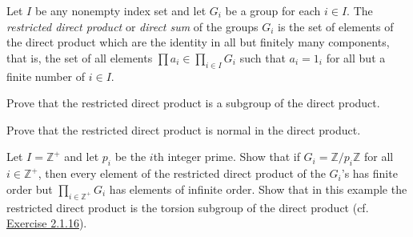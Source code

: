 \begin{exercise}\label{ex5.1.17}
    Let $I$ be any nonempty index set and let $G_i$ be a group for each $i \in I$. The \emph{restricted direct product} or \emph{direct sum} of the groups $G_i$ is the set of elements of the direct product which are the identity in all but finitely many components, that is, the set of all elements $\prod a_i \in \prod_{i \in I} G_i$ such that $a_i = 1_i$ for all but a finite number of $i \in I$.
    \begin{subproblems}
        \item Prove that the restricted direct product is a subgroup of the direct product.
        \item Prove that the restricted direct product is normal in the direct product.
        \item Let $I = \mathbb{Z}^+$ and let $p_i$ be the $i$th integer prime. Show that if $G_i = \mathbb{Z}/p_i\mathbb{Z}$ for all $i \in \mathbb{Z}^+$, then every element of the restricted direct product of the $G_i$'s has finite order but $\prod_{i \in \mathbb{Z}^+} G_i$ has elements of infinite order. Show that in this example the restricted direct product is the torsion subgroup of the direct product (cf. \hyperref[ex2.1.16]{Exercise 2.1.16}).
    \end{subproblems}
\end{exercise}

